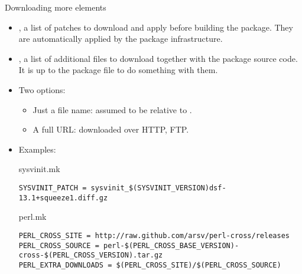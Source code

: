 \begin{frame}[fragile]{Downloading more elements}
  \begin{itemize}
  \item {}, a list of patches to download and apply
    before building the package. They are automatically applied by the
    package infrastructure.
  \item {}, a list of additional files to
    download together with the package source code. It is up to the
    package  file to do something with them.
  \item Two options:
    \begin{itemize}
    \item Just a file name: assumed to be relative to .
    \item A full URL: downloaded over HTTP, FTP.
    \end{itemize}
  \item Examples:
    \begin{block}{sysvinit.mk}
      \begin{verbatim}
SYSVINIT_PATCH = sysvinit_$(SYSVINIT_VERSION)dsf-13.1+squeeze1.diff.gz
      \end{verbatim}
    \end{block}

    \begin{block}{perl.mk}
      \begin{verbatim}
PERL_CROSS_SITE = http://raw.github.com/arsv/perl-cross/releases
PERL_CROSS_SOURCE = perl-$(PERL_CROSS_BASE_VERSION)-cross-$(PERL_CROSS_VERSION).tar.gz
PERL_EXTRA_DOWNLOADS = $(PERL_CROSS_SITE)/$(PERL_CROSS_SOURCE)
      \end{verbatim}
    \end{block}
  \end{itemize}
\end{frame}

